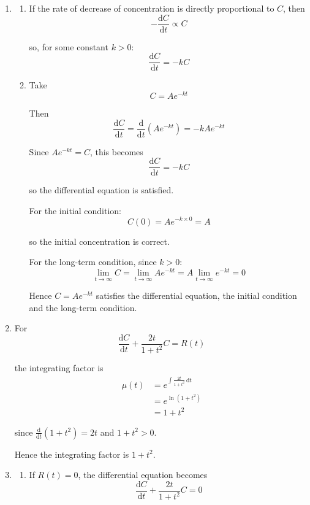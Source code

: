 \documentclass[leqno]{article}
\begin{document}
\begin{enumerate}[
  label=\textbf{\arabic*.},
  leftmargin=*,
  topsep=0pt,
  partopsep=0pt,
  parsep=0pt
]
\vspace*{10pt}

\begin{djsSolution}
\begin{enumerate}[label=\textbf{(\alph*)}]
  \item
  \begin{enumerate}[label=(\roman*)]
    \item If the rate of decrease of concentration is directly proportional to \(C\), then
    \[
    -\frac{\mathrm{d}C}{\mathrm{d}t}\propto C
    \]

    so, for some constant \(k>0\):
    \[
    \frac{\mathrm{d}C}{\mathrm{d}t}=-kC
    \]

    \item Take
    \[
    C=Ae^{-kt}
    \]

    Then
    \[
    \frac{\mathrm{d}C}{\mathrm{d}t}=\frac{\mathrm{d}}{\mathrm{d}t}(Ae^{-kt})=-kAe^{-kt}
    \]

    Since \(Ae^{-kt}=C\), this becomes
    \[
    \frac{\mathrm{d}C}{\mathrm{d}t}=-kC
    \]

    so the differential equation is satisfied.

    For the initial condition:
    \[
    C(0)=Ae^{-k\times 0}=A
    \]

    so the initial concentration is correct.

    For the long-term condition, since \(k>0\):
    \[
    \lim_{t\to\infty}C=\lim_{t\to\infty}Ae^{-kt}=A\lim_{t\to\infty}e^{-kt}=0
    \]

    Hence \(C=Ae^{-kt}\) satisfies the differential equation, the initial condition and the long-term condition.
  \end{enumerate}

  \item For
  \[
  \frac{\mathrm{d}C}{\mathrm{d}t}+\frac{2t}{1+t^2}C=R(t)
  \]

  the integrating factor is
  \begin{align*}
  \mu(t)&=e^{\int \frac{2t}{1+t^2}\,\mathrm{d}t}\\
  &=e^{\ln(1+t^2)}\\
  &=1+t^2
  \end{align*}

  since \(\frac{\mathrm{d}}{\mathrm{d}t}(1+t^2)=2t\) and \(1+t^2>0\).

  Hence the integrating factor is \(1+t^2\).

  \item
  \begin{enumerate}[label=(\roman*)]
    \item If \(R(t)=0\), the differential equation becomes
    \[
    \frac{\mathrm{d}C}{\mathrm{d}t}+\frac{2t}{1+t^2}C=0
    \]


\end{enumerate}
\end{enumerate}
\end{djsSolution}
\end{enumerate}
\end{document}
